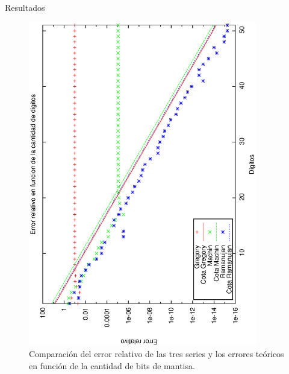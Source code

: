 \begin{section}{Resultados}
	\begin{figure}[H]
	  \centering
		\includegraphics[width=10cm,angle=-90]{graficos/cotas.eps}
	  \caption{Comparación del error relativo de las tres series y los errores teóricos en función de la cantidad de bits de mantisa.}
	  \label{fig:cotas}
	\end{figure}
\end{section}
